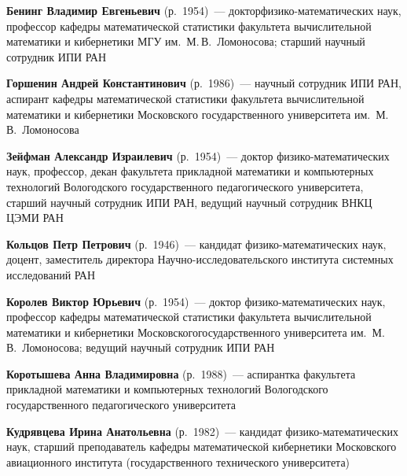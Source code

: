 \begin{multicols}{2}

\noindent
\textbf{Бенинг Владимир Евгеньевич} (р.\ 1954)~---  доктор\linebreak фи\-зи\-ко-математических наук, 
профессор ка\-фед\-ры математической статистики факультета вы\-чис\-ли\-тель\-ной 
математики  и кибернетики МГУ им.\ М.\,В.~Ломоносова; старший научный сотрудник 
ИПИ РАН


\vspace*{6pt}

\noindent
\textbf{Горшенин Андрей Константинович} (р.\ 1986)~--- научный сотрудник 
ИПИ РАН, аспирант кафедры математической статистики факультета
вычислительной математики и кибернетики 
Московского государственного университета им.~М.\,В.~Ломоносова

\vspace*{6pt}

\noindent
\textbf{Зейфман Александр Израилевич} (р.\ 1954)~--- доктор
физико-математических наук, профессор, декан факультета прикладной
математики и компьютерных технологий Вологодского государственного
педагогического университета, старший научный сотрудник ИПИ РАН,
ведущий научный сотрудник ВНКЦ ЦЭМИ РАН

\vspace*{6pt}

\noindent
\textbf{Кольцов Петр Петрович} (р.\ 1946)~--- кандидат фи\-зи\-ко-математических наук, 
доцент, заместитель директора Научно-исследовательского института сис\-тем\-ных исследований РАН


\vspace*{6pt}

\noindent
\textbf{Королев Виктор Юрьевич} (р.\ 1954)~--- доктор фи\-зи\-ко-ма\-те\-ма\-ти\-че\-ских наук, 
профессор кафедры математической статистики факультета вычислительной математики и кибернетики 
Московского\linebreak государственного университета им.~М.\,В.~Ломоносова;
ведущий научный сотрудник ИПИ РАН

\vspace*{6pt}

\noindent
\textbf{Коротышева Анна Владимировна} (р.\ 1988)~--- аспирантка факультета
прикладной математики и компьютерных технологий Вологодского
государственного педагогического университета

\vspace*{6pt}

\noindent
\textbf{Кудрявцева Ирина Анатольевна} (р.\ 1982)~--- кандидат фи\-зи\-ко-математических наук, 
старший преподаватель кафедры математической кибернетики Мос\-ков\-ско\-го 
авиационного института (государственного технического университета)



\end{multicols}
